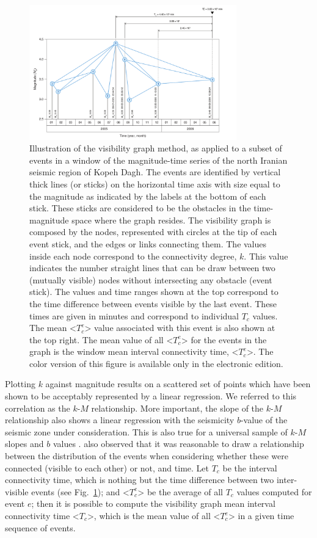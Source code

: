 \begin{figure}[t]
	\centering
	\includegraphics[width=0.8\textwidth]{figure-01} 
	\caption{Illustration of the visibility graph method, as applied to a subset of events in a window of the magnitude-time series of the north Iranian seismic region of Kopeh Dagh. The events are identified by vertical thick lines (or sticks) on the horizontal time axis with size equal to the magnitude as indicated by the labels at the bottom of each stick. These sticks are considered to be the obstacles in the time-magnitude space where the graph resides. The visibility graph is composed by the nodes, represented with circles at the tip of each event stick, and the edges or links connecting them. The values inside each node correspond to the connectivity degree, $k$. This value indicates the number straight lines that can be draw between two (mutually visible) nodes without intersecting any obstacle (event stick). The values and time ranges shown at the top correspond to the time difference between events visible by the last event. These times are given in minutes and correspond to individual $T_c$ values. The mean <$T_c^e$> value associated with this event is also shown at the top right. The mean value of all <$T_c^e$> for the events in the graph is the window mean interval connectivity time, <$T_c^e$>. The color version of this figure is available only in the electronic edition.}
	\label{fig:vg}
\end{figure}

Plotting $k$ against magnitude results on a scattered set of points which have been shown to be acceptably represented by a linear regression. We referred to this correlation as the $k$-$M$ relationship. More important, the slope of the $k$-$M$ relationship also shows a linear regression with the seismicity $b$-value of the seismic zone under consideration. This is also true for a universal sample of $k$-$M$ slopes and $b$ values \citep{Telesca2013, Telesca2014}. \citet{Telesca2014} also observed that it was reasonable to draw a relationship between the distribution of the events when considering whether these were connected (visible to each other) or not, and time. Let $T_c$ be the interval connectivity time, which is nothing but the time difference between two inter-visible events (see Fig.~\ref{fig:vg}); and <$T_c^e$> be the average of all $T_c$ values computed for event $e$; then it is possible to compute the visibility graph mean interval connectivity time <$T_c$>, which is the mean value of all <$T_c^e$> in a given time sequence of events.

